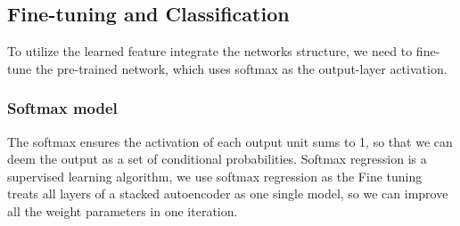 \documentclass[journal]{IEEEtran}
\begin{document}
\subsection{Fine-tuning and Classification}
To utilize the learned feature integrate the networks structure, we need to fine-tune the pre-trained network, which uses softmax as the output-layer activation. 

\subsubsection{Softmax model}The softmax ensures the activation of each output unit sums to 1, so that we can deem the output as a set of conditional probabilities. Softmax regression is a supervised learning algorithm, we use softmax regression as the Fine tuning treats all layers of a stacked autoencoder as one single model, so we can improve all the weight parameters in one iteration. 
\end{document}

